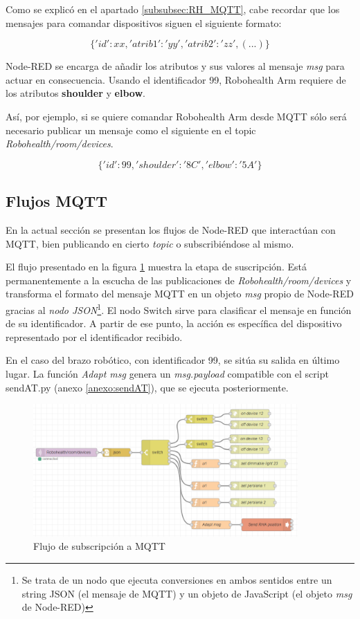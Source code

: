 Como se explicó en el apartado \ref{subsubsec:RH_MQTT}, cabe recordar que los mensajes para comandar dispositivos siguen el siguiente formato:

$$\{'id':xx,'atrib1':'yy','atrib2':'zz',(...)\}$$

Node-RED se encarga de añadir los atributos y sus valores al mensaje \textit{msg} para actuar en consecuencia. Usando el identificador 99, Robohealth Arm requiere de los atributos \textbf{shoulder} y \textbf{elbow}.

Así, por ejemplo, si se quiere comandar Robohealth Arm desde MQTT sólo será necesario publicar un mensaje como el siguiente en el topic \textit{Robohealth/room/devices}.

$$\{'id':99,'shoulder':'8C','elbow':'5A'\}$$

\subsection{Flujos MQTT}

En la actual sección se presentan los flujos de Node-RED que interactúan con MQTT, bien publicando en cierto \textit{topic} o subscribiéndose al mismo.

El flujo presentado en la figura \ref{fig:MQTTFlowR} muestra la etapa de suscripción. Está permanentemente a la escucha de las publicaciones de \textit{Robohealth/room/devices} y transforma el formato del mensaje MQTT en un objeto \textit{msg} propio de Node-RED gracias al \textit{nodo JSON}\footnote{Se trata de un nodo que ejecuta conversiones en ambos sentidos entre un string JSON (el mensaje de MQTT) y un objeto de JavaScript (el objeto \textit{msg} de Node-RED)}. El nodo Switch sirve para clasificar el mensaje en función de su identificador. A partir de ese punto, la acción es específica del dispositivo representado por el identificador recibido.

En el caso del brazo robótico, con identificador 99, se sitúa su salida en último lugar. La función \textit{Adapt msg} genera un \textit{msg.payload} compatible con el script sendAT.py (anexo \ref{anexo:sendAT}), que se ejecuta posteriormente.

\begin{figure}[hbt]
\centering
\includegraphics[width=0.9\textwidth]{figuras/MQTTFlowR.png}
\caption{Flujo de subscripción a MQTT}
\label{fig:MQTTFlowR}
\end{figure}

